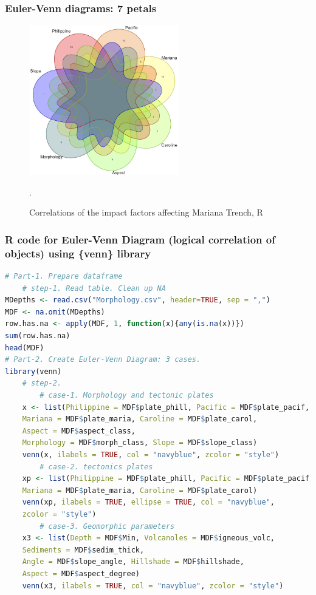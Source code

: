 \documentclass[pdflatex,compress,10pt,
	xcolor={dvipsnames,dvipsnames,svgnames,x11names,table},
	hyperref={colorlinks = true,breaklinks = true, urlcolor = NavyBlue, breaklinks = true}]{beamer}
\begin{document}
\begin{frame}\frametitle{Euler-Venn diagrams: 7 petals}
\begin{figure}[H]
	\centering
		\includegraphics[width=6.5cm]{Fig-5-2c.jpg}\caption{Correlations of the impact factors affecting Mariana Trench, R}.
\end{figure}		
\end{frame}

\begin{frame}[fragile,shrink=10]\frametitle{R code for Euler-Venn Diagram (logical correlation of objects) using \{venn\} library}
\begin{lstlisting}[language=R]
# Part-1. Prepare dataframe 
	# step-1. Read table. Clean up NA
MDepths <- read.csv("Morphology.csv", header=TRUE, sep = ",")
MDF <- na.omit(MDepths) 
row.has.na <- apply(MDF, 1, function(x){any(is.na(x))}) 
sum(row.has.na) 
head(MDF) 
# Part-2. Create Euler-Venn Diagram: 3 cases. 
library(venn)
	# step-2. 
 		# case-1. Morphology and tectonic plates
	x <- list(Philippine = MDF$plate_phill, Pacific = MDF$plate_pacif, 
	Mariana = MDF$plate_maria, Caroline = MDF$plate_carol, 
	Aspect = MDF$aspect_class, 
	Morphology = MDF$morph_class, Slope = MDF$slope_class)
	venn(x, ilabels = TRUE, col = "navyblue", zcolor = "style")
		# case-2. tectonics plates
	xp <- list(Philippine = MDF$plate_phill, Pacific = MDF$plate_pacif, 
	Mariana = MDF$plate_maria, Caroline = MDF$plate_carol)
	venn(xp, ilabels = TRUE, ellipse = TRUE, col = "navyblue", 
	zcolor = "style")
		# case-3. Geomorphic parameters
	x3 <- list(Depth = MDF$Min, Volcanoles = MDF$igneous_volc, 
	Sediments = MDF$sedim_thick, 
	Angle = MDF$slope_angle, Hillshade = MDF$hillshade, 
	Aspect = MDF$aspect_degree)
	venn(x3, ilabels = TRUE, col = "navyblue", zcolor = "style")
\end{lstlisting}
\end{frame}

\end{document}
